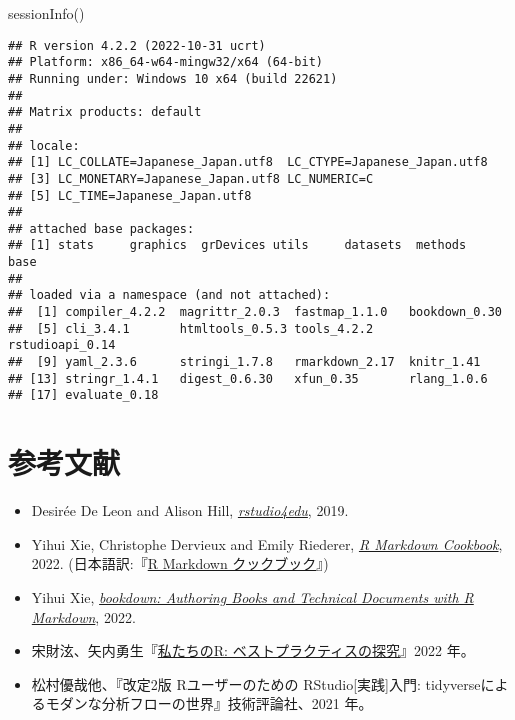 \documentclass[
]{book}
\newenvironment{Shaded}{\begin{snugshade}}{\end{snugshade}}
\newcommand{\FunctionTok}[1]{\textcolor[rgb]{0.00,0.00,0.00}{#1}}
\newcommand{\NormalTok}[1]{#1}
\providecommand{\tightlist}{%
  \setlength{\itemsep}{0pt}\setlength{\parskip}{0pt}}
\begin{document}
\begin{Shaded}
\begin{Highlighting}[]
\FunctionTok{sessionInfo}\NormalTok{()}
\end{Highlighting}
\end{Shaded}

\begin{verbatim}
## R version 4.2.2 (2022-10-31 ucrt)
## Platform: x86_64-w64-mingw32/x64 (64-bit)
## Running under: Windows 10 x64 (build 22621)
## 
## Matrix products: default
## 
## locale:
## [1] LC_COLLATE=Japanese_Japan.utf8  LC_CTYPE=Japanese_Japan.utf8   
## [3] LC_MONETARY=Japanese_Japan.utf8 LC_NUMERIC=C                   
## [5] LC_TIME=Japanese_Japan.utf8    
## 
## attached base packages:
## [1] stats     graphics  grDevices utils     datasets  methods   base     
## 
## loaded via a namespace (and not attached):
##  [1] compiler_4.2.2  magrittr_2.0.3  fastmap_1.1.0   bookdown_0.30  
##  [5] cli_3.4.1       htmltools_0.5.3 tools_4.2.2     rstudioapi_0.14
##  [9] yaml_2.3.6      stringi_1.7.8   rmarkdown_2.17  knitr_1.41     
## [13] stringr_1.4.1   digest_0.6.30   xfun_0.35       rlang_1.0.6    
## [17] evaluate_0.18
\end{verbatim}

\hypertarget{ref}{%
\section*{参考文献}\label{ref}}

\begin{itemize}
\tightlist
\item
  Desirée De Leon and Alison Hill, \href{https://rstudio4edu.github.io/rstudio4edu-book/}{\emph{rstudio4edu}}, 2019.
\item
  Yihui Xie, Christophe Dervieux and Emily Riederer, \href{https://bookdown.org/yihui/rmarkdown-cookbook/}{\emph{R Markdown Cookbook}}, 2022. (日本語訳:『\href{https://gedevan-aleksizde.github.io/rmarkdown-cookbook/}{R Markdown クックブック}』)
\item
  Yihui Xie, \href{https://bookdown.org/yihui/bookdown/}{\emph{bookdown: Authoring Books and Technical Documents with R Markdown}}, 2022.
\item
  宋財泫、矢内勇生『\href{https://www.jaysong.net/RBook/}{私たちのR: ベストプラクティスの探究}』2022 年。
\item
  松村優哉他、『改定2版 Rユーザーのための RStudio{[}実践{]}入門: tidyverseによるモダンな分析フローの世界』技術評論社、2021 年。
\end{itemize}

  
\end{document}
